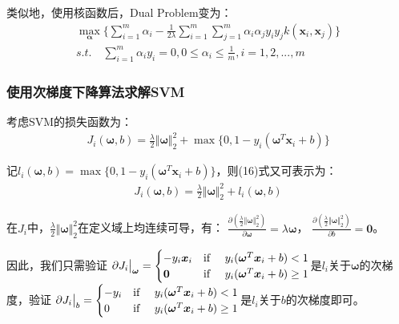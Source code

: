 \documentclass[12pt, a4paper]{article}
\newcommand{\ivec}{\bm}
\newcommand{\omegav}{\ivec{\omega}}
\newcommand{\alphav}{\ivec{\alpha}}
\newcommand{\xv}{\ivec{x}}
\begin{document}
        类似地，使用核函数后，Dual Problem变为：
        \begin{equation}\begin{aligned}
        \max\limits_{\alphav}\{\sum_{i = 1}^{m} \alpha_i - \frac{1}{2 \lambda} \sum_{i = 1}^{m} \sum_{j = 1}^{m} \alpha_i \alpha_j y_i y_j k(\xv_i, \xv_j)\} \\
        s.t. \quad \sum_{i = 1}^{m} \alpha_i y_i = 0, 0 \le \alpha_i \le \frac{1}{m}, i = 1, 2, ..., m
        \end{aligned}\end{equation}

    \subsubsection{使用次梯度下降算法求解SVM}

        考虑SVM的损失函数为：
        \begin{equation}\begin{aligned}
        J_i(\omegav, b) = \frac{\lambda}{2} \Vert \omegav \Vert_2^2 + \max\{0, 1 - y_i (\omegav^T \xv_i + b)\}
        \end{aligned}\end{equation}

        记$l_i(\omegav, b) = \max\{0, 1 - y_i (\omegav^T \xv_i + b)\}$，则(16)式又可表示为：
        \begin{align*}
        J_i(\omegav, b) = \frac{\lambda}{2} \Vert \omegav \Vert_2^2 + l_i(\omegav, b)
        \end{align*}

        在$J_i$中，$\frac{\lambda}{2} \Vert \omegav \Vert_2^2$在定义域上均连续可导，有：
        $\frac{\partial (\frac{\lambda}{2} \Vert \omegav \Vert_2^2)}{\partial \omegav} = \lambda \omegav$，
        $\frac{\partial (\frac{\lambda}{2} \Vert \omegav \Vert_2^2)}{\partial b} = \ivec{0}$。

        因此，我们只需验证
        $\partial J_i \big|_{\omegav} = \begin{cases}
        -y_i \xv_i & \text{if \quad} y_i (\omegav^T \xv_i + b) < 1 \\
        \ivec{0}   & \text{if \quad} y_i (\omegav^T \xv_i + b) \ge 1
        \end{cases}$是$l_i$关于$\omegav$的次梯度，验证
        $\partial J_i \big|_b = \begin{cases}
        -y_i & \text{if \quad} y_i (\omegav^T \xv_i + b) < 1 \\
        0    & \text{if \quad} y_i (\omegav^T \xv_i + b) \ge 1
        \end{cases}$是$l_i$关于$b$的次梯度即可。
\end{document}
